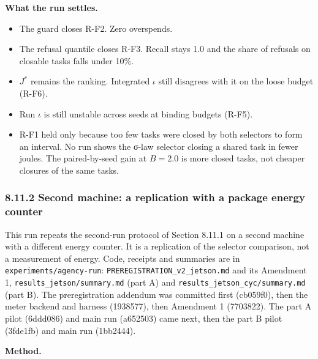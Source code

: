 \documentclass[
  10pt,
]{article}
\providecommand{\tightlist}{%
  \setlength{\itemsep}{0pt}\setlength{\parskip}{0pt}}
\begin{document}
\textbf{What the run settles.}

\begin{itemize}
\tightlist
\item
  The guard closes R-F2. Zero overspends.
\item
  The refusal quantile closes R-F3. Recall stays 1.0 and the share of
  refusals on closable tasks falls under 10\%.
\item
  \(J^*\) remains the ranking. Integrated \(\iota\) still disagrees with
  it on the loose budget (R-F6).
\item
  Run \(\iota\) is still unstable across seeds at binding budgets
  (R-F5).
\item
  R-F1 held only because too few tasks were closed by both selectors to
  form an interval. No run shows the σ-law selector closing a shared
  task in fewer joules. The paired-by-seed gain at \(B = 2.0\) is more
  closed tasks, not cheaper closures of the same tasks.
\end{itemize}

\subsubsection{8.11.2 Second machine: a replication with a package
energy
counter}\label{second-machine-a-replication-with-a-package-energy-counter}

This run repeats the second-run protocol of Section 8.11.1 on a second
machine with a different energy counter. It is a replication of the
selector comparison, not a measurement of energy. Code, receipts and
summaries are in \texttt{experiments/agency-run}:
\texttt{PREREGISTRATION\_v2\_jetson.md} and its Amendment 1,
\texttt{results\_jetson/summary.md} (part A) and
\texttt{results\_jetson\_cyc/summary.md} (part B). The preregistration
addendum was committed first (cb059f0), then the meter backend and
harness (1938577), then Amendment 1 (7703822). The part A pilot
(6ddd086) and main run (a652503) came next, then the part B pilot
(3fde1fb) and main run (1bb2444).

\textbf{Method.}
\end{document}
